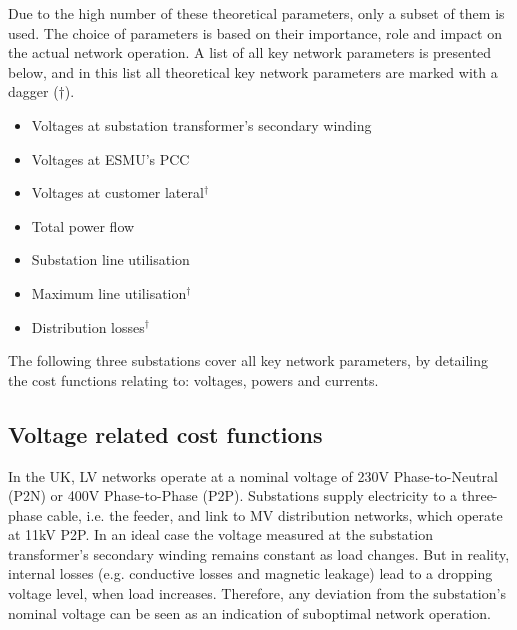 Due to the high number of these theoretical parameters, only a subset of them is used.
The choice of parameters is based on their importance, role and impact on the actual network operation.
A list of all key network parameters is presented below, and in this list all theoretical key network parameters are marked with a dagger ($\dagger$).

\begin{itemize}
	\item Voltages at substation transformer's secondary winding
	\item Voltages at ESMU's PCC
	\item Voltages at customer lateral$^{\dagger}$
	\item Total power flow
	\item Substation line utilisation
	\item Maximum line utilisation$^{\dagger}$
	\item Distribution losses$^{\dagger}$
\end{itemize}


The following three substations cover all key network parameters, by detailing the cost functions relating to: voltages, powers and currents.

\subsection{Voltage related cost functions}
\label{ch1:subsec:voltages-related-cost-functions}


In the UK, LV networks operate at a nominal voltage of 230V Phase-to-Neutral (P2N) or 400V Phase-to-Phase (P2P).
Substations supply electricity to a three-phase cable, i.e. the feeder, and  link to MV distribution networks, which operate at 11kV P2P.
In an ideal case the voltage measured at the substation transformer's secondary winding remains constant as load changes.
But in reality, internal losses (e.g. conductive losses and magnetic leakage) lead to a dropping voltage level, when load increases.
Therefore, any deviation from the substation's nominal voltage can be seen as an indication of suboptimal network operation.

